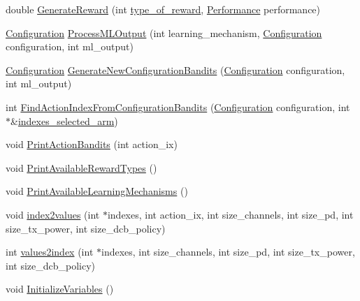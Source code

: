 \begin{DoxyCompactItemize}
\item 
double \hyperlink{classPreProcessor_ab5d4746e7a0360611e5ef492db5ceec0}{Generate\+Reward} (int \hyperlink{classPreProcessor_a6b837daa4f40e20f9d7bbdbd1b2ef1d2}{type\+\_\+of\+\_\+reward}, \hyperlink{structPerformance}{Performance} performance)
\item 
\hyperlink{structConfiguration}{Configuration} \hyperlink{classPreProcessor_aa24ca9b6d851941b0654b72520fb5a81}{Process\+M\+L\+Output} (int learning\+\_\+mechanism, \hyperlink{structConfiguration}{Configuration} configuration, int ml\+\_\+output)
\item 
\hyperlink{structConfiguration}{Configuration} \hyperlink{classPreProcessor_a1314ba4c5f3e17cdcf2f11d49f40c148}{Generate\+New\+Configuration\+Bandits} (\hyperlink{structConfiguration}{Configuration} configuration, int ml\+\_\+output)
\item 
int \hyperlink{classPreProcessor_a484b126cf65d3a2afda4eb0770276c5b}{Find\+Action\+Index\+From\+Configuration\+Bandits} (\hyperlink{structConfiguration}{Configuration} configuration, int $\ast$\&\hyperlink{classPreProcessor_a1976003ebd08bbee7836fe0bbe2d7be9}{indexes\+\_\+selected\+\_\+arm})
\item 
void \hyperlink{classPreProcessor_a498d0b26c66a2fd2c20a19afe491c5d6}{Print\+Action\+Bandits} (int action\+\_\+ix)
\item 
void \hyperlink{classPreProcessor_a675a191d53d9e095138881eabbebba7b}{Print\+Available\+Reward\+Types} ()
\item 
void \hyperlink{classPreProcessor_aadb7f0d35267038245fa9482da146f70}{Print\+Available\+Learning\+Mechanisms} ()
\item 
void \hyperlink{classPreProcessor_a11800dabafafd6de4cd1129ebb56cab2}{index2values} (int $\ast$indexes, int action\+\_\+ix, int size\+\_\+channels, int size\+\_\+pd, int size\+\_\+tx\+\_\+power, int size\+\_\+dcb\+\_\+policy)
\item 
int \hyperlink{classPreProcessor_a818563f4556239d78eb3874318fc33ba}{values2index} (int $\ast$indexes, int size\+\_\+channels, int size\+\_\+pd, int size\+\_\+tx\+\_\+power, int size\+\_\+dcb\+\_\+policy)
\item 
void \hyperlink{classPreProcessor_a3a865e8349e7eabfa968eea7075386c2}{Initialize\+Variables} ()
\end{DoxyCompactItemize}
